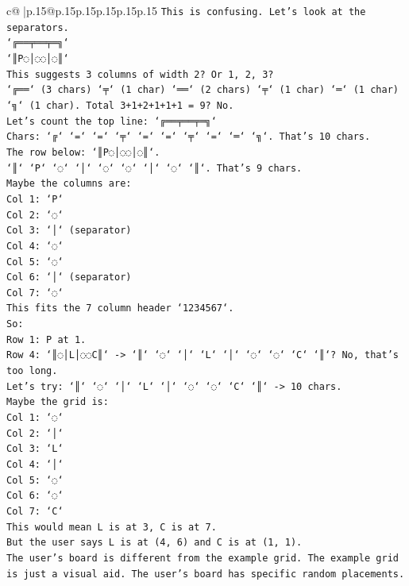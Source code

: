 \documentclass{article}
\begin{document}
{\begin{supertabular}{c@{$\;$}|p{.15\linewidth}@{}p{.15\linewidth}p{.15\linewidth}p{.15\linewidth}p{.15\linewidth}p{.15\linewidth}}
{{{\texttt{This is confusing. Let's look at the separators.} \\
\texttt{`╔══╤══╤═╗`} \\
\texttt{`║P◌│◌◌│◌║`} \\
\texttt{This suggests 3 columns of width 2? Or 1, 2, 3?} \\
\texttt{`╔══` (3 chars) `╤` (1 char) `══` (2 chars) `╤` (1 char) `═` (1 char) `╗` (1 char). Total 3+1+2+1+1+1 = 9? No.} \\
\texttt{Let's count the top line: `╔══╤══╤═╗`} \\
\texttt{Chars: `╔` `=` `=` `╤` `=` `=` `╤` `=` `═` `╗`. That's 10 chars.} \\
\texttt{The row below: `║P◌│◌◌│◌║`.} \\
\texttt{`║` `P` `◌` `│` `◌` `◌` `│` `◌` `║`. That's 9 chars.} \\
\texttt{Maybe the columns are:} \\
\texttt{Col 1: `P`} \\
\texttt{Col 2: `◌`} \\
\texttt{Col 3: `│` (separator)} \\
\texttt{Col 4: `◌`} \\
\texttt{Col 5: `◌`} \\
\texttt{Col 6: `│` (separator)} \\
\texttt{Col 7: `◌`} \\
\texttt{This fits the 7 column header `1234567`.} \\
\texttt{So:} \\
\texttt{Row 1: P at 1.} \\
\texttt{Row 4: `║◌│L│◌◌C║` {-}> `║` `◌` `│` `L` `│` `◌` `◌` `C` `║`? No, that's too long.} \\
\texttt{Let's try: `║` `◌` `│` `L` `│` `◌` `◌` `C` `║` {-}> 10 chars.} \\
\texttt{Maybe the grid is:} \\
\texttt{Col 1: `◌`} \\
\texttt{Col 2: `│`} \\
\texttt{Col 3: `L`} \\
\texttt{Col 4: `│`} \\
\texttt{Col 5: `◌`} \\
\texttt{Col 6: `◌`} \\
\texttt{Col 7: `C`} \\
\texttt{This would mean L is at 3, C is at 7.} \\
\texttt{But the user says L is at (4, 6) and C is at (1, 1).} \\
\texttt{The user's board is different from the example grid. The example grid is just a visual aid. The user's board has specific random placements.} \\
}}}
\end{supertabular}}
\end{document}
